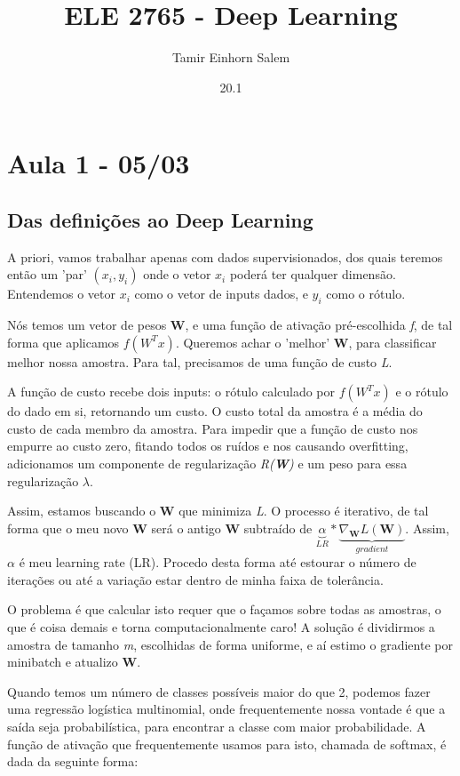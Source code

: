 \documentclass{article}
\title{ELE 2765 - Deep Learning}
\author{Tamir Einhorn Salem}
\date{20.1}
\begin{document}
\maketitle
\tableofcontents

\section{Aula 1 - 05/03}

\subsection{Das definições ao Deep Learning}

A priori, vamos trabalhar apenas com dados supervisionados, dos quais teremos então um 'par' $(x_i, y_i)$ onde o vetor $x_i$ poderá ter qualquer dimensão. 
Entendemos o vetor $x_i$ como o vetor de inputs dados, e $y_i$ como o rótulo. \par
Nós temos um vetor de pesos \textbf{W}, e uma função de ativação pré-escolhida \textit{f}, de tal forma que aplicamos $f(W^{T}x)$. Queremos achar o 'melhor' \textbf{W}, para classificar melhor nossa amostra. Para tal, precisamos de uma função de custo \textit{L}. \par
A função de custo recebe dois inputs: o rótulo calculado por $f(W^{T}x)$ e o rótulo do dado em si, retornando um custo. O custo total da amostra é a média do custo de cada membro da amostra. Para impedir que a função de custo nos empurre ao custo zero, fitando todos os ruídos e nos causando overfitting, adicionamos um componente de regularização \textit{R(\textbf{W})} e um peso para essa regularização $\lambda$.\par
Assim, estamos buscando o \textbf{W} que minimiza \textit{L}. O processo é iterativo, de tal forma que o meu novo \textbf{W} será o antigo \textbf{W} subtraído de $\underbrace{\alpha}_{LR} * \underbrace{\nabla_{\textbf{W}} L(\textbf{W})}_{gradient}$. Assim, $\alpha $ é meu learning rate (LR). Procedo desta forma até estourar o número de iterações ou até a variação estar dentro de minha faixa de tolerância. \par
O problema é que calcular isto requer que o façamos sobre todas as amostras, o que é coisa demais e torna computacionalmente caro! A solução é dividirmos a amostra de tamanho \textit{m}, escolhidas de forma uniforme, e aí estimo o gradiente por minibatch e atualizo \textbf{W}. \par
Quando temos um número de classes possíveis maior do que 2, podemos fazer uma regressão logística multinomial, onde frequentemente nossa vontade é que a saída seja probabilística, para encontrar a classe com maior probabilidade. A função de ativação que frequentemente usamos para isto, chamada de softmax, é dada da seguinte forma:
\end{document}
